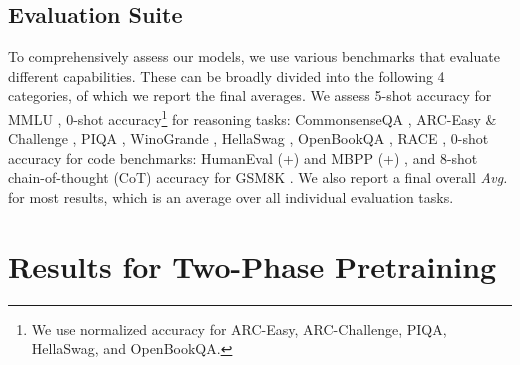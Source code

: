\documentclass[11pt]{article}
\begin{document}
\subsection{Evaluation Suite}
\label{sec:eval-suite}


To comprehensively assess our models, we use various benchmarks that evaluate different capabilities. These can be broadly divided into the following 4 categories, of which we report the final averages. We assess 5-shot accuracy for MMLU \cite{hendrycks2021MMLU}, 0-shot accuracy\footnote{We use normalized accuracy for ARC-Easy, ARC-Challenge, PIQA, HellaSwag, and OpenBookQA.} for reasoning tasks:  CommonsenseQA \cite{talmor-etal-2019-commonsenseqa}, ARC-Easy \& Challenge \cite{ARC-clark2018thinksolvedquestionanswering}, PIQA \cite{PIQA-bisk2019piqareasoningphysicalcommonsense}, WinoGrande \cite{WinoGrande-sakaguchi2019winograndeadversarialwinogradschema}, HellaSwag \cite{zellers-etal-2019-hellaswag}, OpenBookQA \cite{openbookQA-mihaylov-etal-2018-suit}, RACE \cite{RACE-lai-etal-2017-race}, 0-shot accuracy for code benchmarks: HumanEval (+) \cite{HumanEval-chen2021evaluatinglargelanguagemodels} and MBPP (+) \cite{MBPP-austin2021programsynthesislargelanguage}, and 8-shot chain-of-thought (CoT) accuracy for GSM8K \cite{GSM8K-cobbe2021trainingverifierssolvemath}. We also report a final overall \textit{Avg.} for most results, which is an average over all individual evaluation tasks. 


\begin{table}[t]%
\begin{center}
\end{center}
\caption[]{Comparison of our two-phase training approach with BASE-ND and BASE-RO.
\label{tab:rand-vs-two-phase-result}}
\end{table}


\section{Results for Two-Phase Pretraining}
\label{subsec:two-phase-results}
\end{document}

